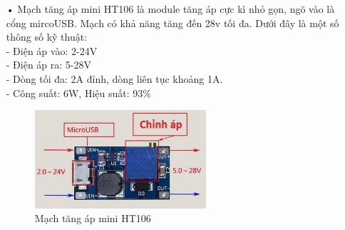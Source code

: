 \begin{itemize}
	\item[•]Mạch tăng áp mini HT106 là module tăng áp cực kì nhỏ gọn, ngõ vào là cổng mircoUSB. Mạch có khả năng tăng đến 28v tối đa. Dưới đây là một số thông số kỹ thuật:\\
	-	Điện áp vào: 2-24V\\
	-	Điện áp ra: 5-28V\\
	-	Dòng tối đa: 2A đỉnh, dòng liên tục khoảng 1A.\\
	-	Công suất: 6W, Hiệu suất: 93\%
	\begin{figure}[H]
		\centering    
		\includegraphics[width=2.5in]{ht06}
		\caption[Mạch tăng áp mini HT106]{Mạch tăng áp mini HT106}
		\label{fig:ht06}
	\end{figure}
	

\end{itemize}

